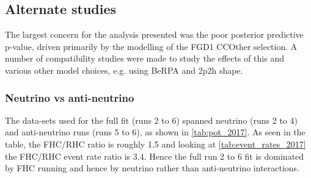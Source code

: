 


\subsection{Alternate studies}
The largest concern for the analysis presented was the poor posterior predictive p-value, driven primarily by the modelling of the FGD1 CCOther selection. A number of compatibility studies were made to study the effects of this and various other model choices, e.g. using BeRPA and 2p2h shape.


\subsubsection{Neutrino vs anti-neutrino}
The data-sets used for the full fit (runs 2 to 6) spanned neutrino (runs 2 to 4) and anti-neutrino runs (runs 5 to 6), as shown in  \autoref{tab:pot_2017}. As seen in the table, the FHC/RHC ratio is roughly 1.5 and looking at \autoref{tab:event_rates_2017} the FHC/RHC event rate ratio is 3.4. Hence the full run 2 to 6 fit is dominated by FHC running and hence by neutrino rather than anti-neutrino interactions.

